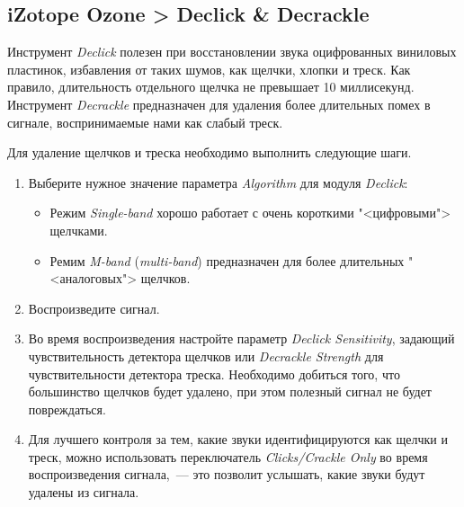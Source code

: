 \documentclass{beamer}
\begin{document}
\subsection{iZotope Ozone > Declick \& Decrackle}
\begin{frame}
Инструмент \emph{Declick} полезен при восстановлении звука оцифрованных виниловых пластинок, избавления от таких шумов, как щелчки, хлопки и треск. Как правило, длительность отдельного щелчка не превышает 10 миллисекунд. Инструмент \emph{Decrackle} предназначен для удаления более длительных помех в сигнале, воспринимаемые нами как слабый треск.


\end{frame}

\begin{frame}
Для удаление щелчков и треска необходимо выполнить следующие шаги.
\begin{enumerate}
  \item Выберите нужное значение параметра \emph{Algorithm} для модуля \emph{Declick}:
  \begin{itemize}
    \item Режим \emph{Single-band} хорошо работает с очень короткими "<цифровыми"> щелчками.
    \item Ремим \emph{M-band} (\emph{multi-band}) предназначен для более длительных "<аналоговых"> щелчков.
  \end{itemize}
  \item Воспроизведите сигнал.
  \item Во время воспроизведения настройте параметр \emph{Declick Sensitivity}, задающий чувствительность детектора щелчков или \emph{Decrackle Strength} для чувствительности детектора треска. Необходимо добиться того, что большинство щелчков будет удалено, при этом полезный сигнал не будет повреждаться.
  \item Для лучшего контроля за тем, какие звуки идентифицируются как щелчки и треск, можно использовать переключатель \emph{Clicks/Crackle Only} во время воспроизведения сигнала,~--- это позволит  услышать, какие звуки будут удалены из сигнала.
\end{enumerate}
\end{frame}
\end{document}
